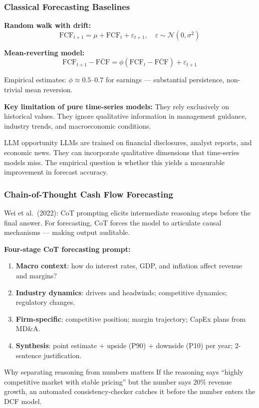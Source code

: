 \documentclass[9pt,t]{beamer}
\begin{document}
\begin{frame}
\frametitle{Classical Forecasting Baselines}

\textbf{Random walk with drift:}
\[
  \text{FCF}_{t+1} = \mu + \text{FCF}_t + \varepsilon_{t+1}, \quad \varepsilon \sim \mathcal{N}(0,\sigma^2)
\]

\textbf{Mean-reverting model:}
\[
  \text{FCF}_{t+1} - \bar{\text{FCF}} = \phi(\text{FCF}_t - \bar{\text{FCF}}) + \varepsilon_{t+1}
\]

Empirical estimates: $\phi \approx 0.5$--$0.7$ for earnings --- substantial persistence, non-trivial mean reversion.

\medskip
\textbf{Key limitation of pure time-series models:}
They rely exclusively on historical values.
They ignore qualitative information in management guidance, industry trends, and macroeconomic conditions.

\medskip
\begin{block}{LLM opportunity}
LLMs are trained on financial disclosures, analyst reports, and economic news.
They can incorporate qualitative dimensions that time-series models miss.
The empirical question is whether this yields a measurable improvement in forecast accuracy.
\end{block}
\end{frame}

\begin{frame}
\frametitle{Chain-of-Thought Cash Flow Forecasting}

Wei et al.\ (2022): CoT prompting elicits intermediate reasoning steps before the final answer.
For forecasting, CoT forces the model to articulate causal mechanisms --- making output auditable.

\medskip
\textbf{Four-stage CoT forecasting prompt:}
\begin{enumerate}
  \item \textbf{Macro context}: how do interest rates, GDP, and inflation affect revenue and margins?
  \item \textbf{Industry dynamics}: drivers and headwinds; competitive dynamics; regulatory changes.
  \item \textbf{Firm-specific}: competitive position; margin trajectory; CapEx plans from MD\&A.
  \item \textbf{Synthesis}: point estimate + upside (P90) + downside (P10) per year; 2-sentence justification.
\end{enumerate}

\medskip
\begin{alertblock}{Why separating reasoning from numbers matters}
If the reasoning says ``highly competitive market with stable pricing'' but the number says 20\% revenue growth,
an automated consistency-checker catches it before the number enters the DCF model.
\end{alertblock}
\end{frame}
\end{document}

